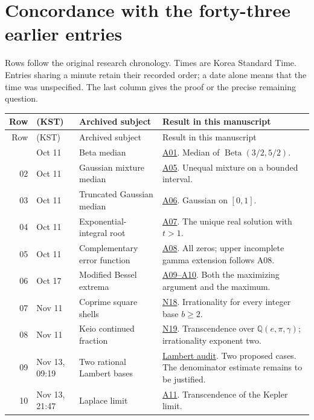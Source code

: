 \documentclass[11pt,a4paper]{article}
\theoremstyle{definition}
\theoremstyle{remark}
\begin{document}
\section{Concordance with the forty-three earlier entries}\label{sec:archive}
Rows follow the original research chronology. Times are Korea Standard Time. Entries sharing a minute retain their recorded order; a date alone means that the time was unspecified. The last column gives the proof or the precise remaining question.
\par\medskip
{\small\renewcommand{\arraystretch}{1.19}\setlength{\tabcolsep}{4pt}
\begin{longtable}{@{}r>{\raggedright\arraybackslash}p{27mm}>{\raggedright\arraybackslash}p{39mm}>{\raggedright\arraybackslash}p{77mm}@{}}
\toprule Row & 2026 (KST) & Archived subject & Result in this manuscript\\\midrule\endfirsthead
\toprule Row & 2026 (KST) & Archived subject & Result in this manuscript\\\midrule\endhead
\bottomrule\endfoot
01 & Oct 11 & Beta median & \hyperlink{cat-A01}{A01}. Median of $\operatorname{Beta}(3/2,5/2)$. \\
02 & Oct 11 & Gaussian mixture median & \hyperlink{cat-A05}{A05}. Unequal mixture on a bounded interval. \\
03 & Oct 11 & Truncated Gaussian median & \hyperlink{cat-A06}{A06}. Gaussian on $[0,1]$. \\
04 & Oct 11 & Exponential-integral root & \hyperlink{cat-A07}{A07}. The unique real solution with $t>1$. \\
05 & Oct 11 & Complementary error function & \hyperlink{cat-A08}{A08}. All zeros; upper incomplete gamma extension follows A08. \\
06 & Oct 17 & Modified Bessel extrema & \hyperlink{cat-A09}{A09--A10}. Both the maximizing argument and the maximum. \\
07 & Nov 11 & Coprime square shells & \hyperlink{cat-N18}{N18}. Irrationality for every integer base $b\ge2$. \\
08 & Nov 11 & Keio continued fraction & \hyperlink{cat-N19}{N19}. Transcendence over $\mathbb Q(e,\pi,\gamma)$; irrationality exponent two. \\
09 & Nov 13, 09:19 & Two rational Lambert bases & \hyperref[sec:nlambertaudit]{Lambert audit}. Two proposed cases. The denominator estimate remains to be justified. \\
10 & Nov 13, 21:47 & Laplace limit & \hyperlink{cat-A11}{A11}. Transcendence of the Kepler limit. \\

\end{longtable}}
\end{document}
